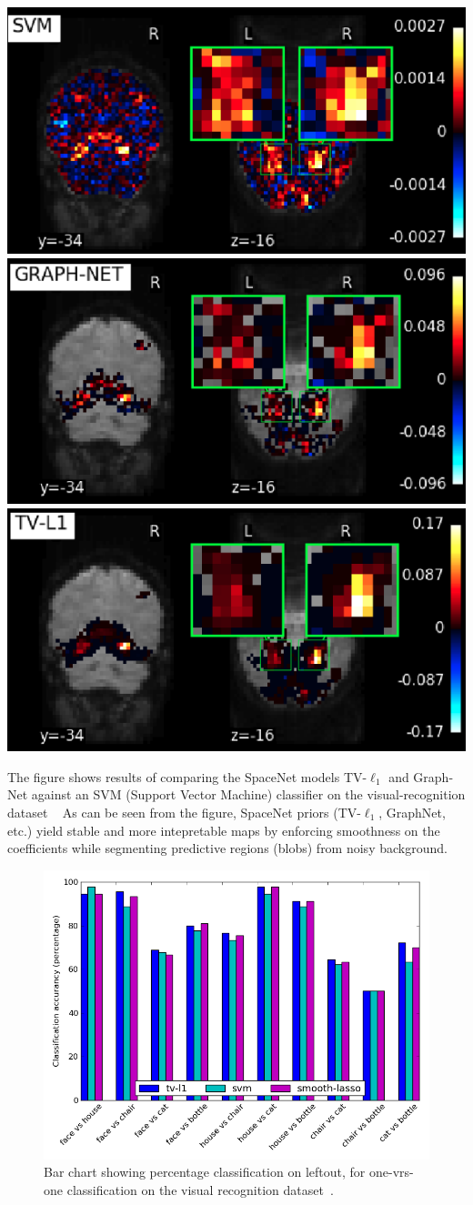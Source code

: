 \begin{pagefigure}%
  \includegraphics[width=.32\linewidth]{figures/svm.png}
  \includegraphics[width=.32\linewidth]{figures/graphnet.png}
  \includegraphics[width=.32\linewidth]{figures/tvl1.png}  
  \caption{The figure shows results of comparing the SpaceNet  models TV-$\ell_1$ and
    Graph-Net against an SVM (Support Vector Machine) classifier on
    the visual-recognition dataset  ~\citep{haxby2001}
    As can be seen from the figure, SpaceNet priors (TV-$\ell_1$, GraphNet, etc.)
    yield stable and more intepretable maps by enforcing smoothness on the coefficients while segmenting predictive regions (blobs) from noisy background.}
  \label{fig:spacenet_maps}
\end{pagefigure}
\begin{figure}[!htbp]
  \includegraphics[width=1\linewidth]{figures/haxby_barchart.png}
  \caption{Bar chart showing percentage classification on leftout, for one-vrs-one classification on the visual recognition dataset~\citep{haxby2001}.
  }
  \label{fig:spacenet_bars}
\end{figure}

